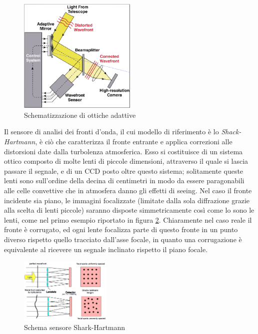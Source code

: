 \begin{figure}[h]
	\centering
	\includegraphics[width=0.5\textwidth]{Immagini/Capitolo2/ottiche_adattive.PNG}
	\caption{Schematizzazione di ottiche adattive}
	\label{im:ottiche-adattive}
\end{figure}

Il sensore di analisi dei fronti d'onda, il cui modello di riferimento è lo \textit{Shack-Hartmann}, è ciò che caratterizza il fronte entrante e applica correzioni alle distorsioni date dalla turbolenza atmosferica. Esso si costituisce di un sistema ottico composto di molte lenti di piccole dimensioni, attraverso il quale si lascia passare il segnale, e di un CCD posto oltre questo sistema; solitamente queste lenti sono sull'ordine della decina di centimetri in modo da essere paragonabili alle celle convettive che in atmosfera danno gli effetti di seeing. Nel caso il fronte incidente sia piano, le immagini focalizzate (limitate dalla sola diffrazione grazie alla scelta di lenti piccole) saranno disposte simmetricamente così come lo sono le lenti, come nel primo esempio riportato in figura \ref{im:sensore-Shack-Hartmann}. Chiaramente nel caso reale il fronte è corrugato, ed ogni lente focalizza parte di questo fronte in un punto diverso rispetto quello tracciato dall'asse focale, in quanto una corrugazione è equivalente al ricevere un segnale inclinato rispetto il piano focale.

\begin{figure}
	\centering
	\includegraphics[width=0.39\textwidth]{Immagini/Capitolo2/sensore_Shark_Hartmann.PNG}
	\caption{Schema sensore Shark-Hartmann}
	\label{im:sensore-Shack-Hartmann}
	\vspace{-10pt}
\end{figure}

